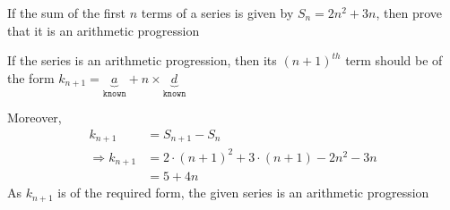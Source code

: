 
%
%
%
%
% 
% 

\question[4] If the sum of the first $n$ terms of a series is given by 
$S_n = 2n^2+3n$, then prove that it is an arithmetic progression


\ifprintanswers
\fi 

\begin{solution}[\halfpage]
  If the series is an arithmetic progression, then its $(n+1)^{th}$ term should be 
  of the form $k_{n+1} = \underbrace{a}_{\texttt{known}} + n\times\underbrace{d}_{\texttt{known}}$
  
  Moreover,
  \begin{align}
     k_{n+1} &= S_{n+1} - S_n \\
        \Rightarrow k_{n+1} &= 2\cdot(n+1)^2 + 3\cdot(n+1) - 2n^2 - 3n \\
        &= 5 + 4n
  \end{align}
  As $k_{n+1}$ is of the required form, the given series is an arithmetic progression
  
\end{solution}
